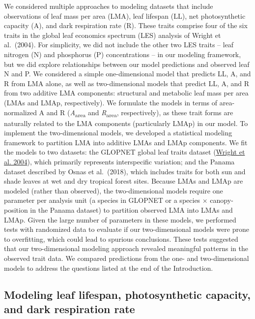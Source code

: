 \documentclass[
  12pt,
  a4paper,
,tablecaptionabove
]{scrartcl}
\begin{document}
We considered multiple approaches to modeling datasets that include observations of leaf mass per area (LMA), leaf lifespan (LL), net photosynthetic capacity (A), and dark respiration rate (R).
These traits comprise four of the six traits in the global leaf economics spectrum (LES) analysis of Wright et al.~(2004).
For simplicity, we did not include the other two LES traits -- leaf nitrogen (N) and phosphorus (P) concentrations -- in our modeling framework, but we did explore relationships between our model predictions and observed leaf N and P.
We considered a simple one-dimensional model that predicts LL, A, and R from LMA alone, as well as two-dimensional models that predict LL, A, and R from two additive LMA components: structural and metabolic leaf mass per area (LMAs and LMAp, respectively).
We formulate the models in terms of area-normalized A and R (\emph{A}\textsubscript{area} and \emph{R}\textsubscript{area}, respectively), as these trait forms are naturally related to the LMA components (particularly LMAp) in our model.
To implement the two-dimensional models, we developed a statistical modeling framework to partition LMA into additive LMAs and LMAp components.
We fit the models to two datasets: the GLOPNET global leaf traits dataset (\protect\hyperlink{ref-Wright2004a}{Wright et al. 2004}), which primarily represents interspecific variation; and the Panama dataset described by Osnas et al.~(2018), which includes traits for both sun and shade leaves at wet and dry tropical forest sites.
Because LMAs and LMAp are modeled (rather than observed), the two-dimensional models require one parameter per analysis unit (a species in GLOPNET or a species \(\times\) canopy-position in the Panama dataset) to partition observed LMA into LMAs and LMAp.
Given the large number of parameters in these models, we performed tests with randomized data to evaluate if our two-dimensional models were prone to overfitting, which could lead to spurious conclusions.
These tests suggested that our two-dimensional modeling approach revealed meaningful patterns in the observed trait data.
We compared predictions from the one- and two-dimensional models to address the questions listed at the end of the Introduction.

\hypertarget{modeling-leaf-lifespan-photosynthetic-capacity-and-dark-respiration-rate}{%
\subsection{Modeling leaf lifespan, photosynthetic capacity, and dark respiration rate}\label{modeling-leaf-lifespan-photosynthetic-capacity-and-dark-respiration-rate}}
\end{document}

